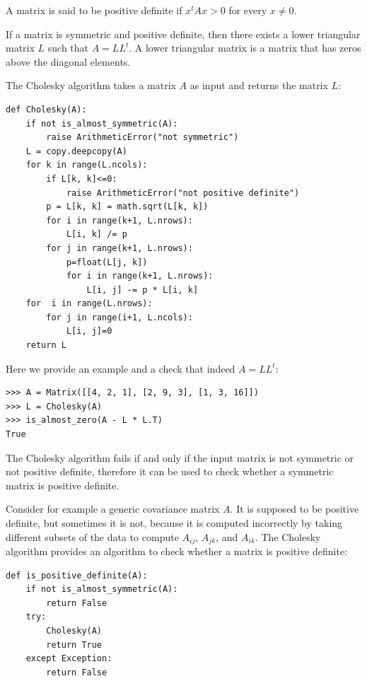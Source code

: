 \documentclass[justified, sixbynine]{tufte-book}
\def\ft{\small\tt}
\theoremstyle{plain}%
\newtheorem * {corollary}{Corollary}
\theoremstyle{definition}
\theoremstyle{remark}
\newtheorem * {remark}{Remark}
\newtheorem * {note}{Note}
\begin{document}
\begin{fullwidth}
A matrix is said to be positive definite if $x^t Ax>0$ for every $x\neq0$.

If a matrix is symmetric and positive definite, then there exists a lower triangular matrix $L$ such that $A=L L^t$. A lower triangular matrix is a matrix that has zeros above the diagonal elements.

The Cholesky algorithm takes a matrix $A$ as input and returns the matrix $L$:

\begin{lstlisting}[caption={in file: {\ft nlib.py}}]
def Cholesky(A):
    if not is_almost_symmetric(A):
        raise ArithmeticError("not symmetric")
    L = copy.deepcopy(A)
    for k in range(L.ncols):
        if L[k, k]<=0:
            raise ArithmeticError("not positive definite")
        p = L[k, k] = math.sqrt(L[k, k])
        for i in range(k+1, L.nrows):
            L[i, k] /= p
        for j in range(k+1, L.nrows):
            p=float(L[j, k])
            for i in range(k+1, L.nrows):
                L[i, j] -= p * L[i, k]
    for  i in range(L.nrows):
        for j in range(i+1, L.ncols):
            L[i, j]=0
    return L
\end{lstlisting}

Here we provide an example and a check that indeed $A=L L^t$:

\begin{lstlisting}[caption={in file: {\ft nlib.py}}]
>>> A = Matrix([[4, 2, 1], [2, 9, 3], [1, 3, 16]])
>>> L = Cholesky(A)
>>> is_almost_zero(A - L * L.T)
True
\end{lstlisting}

The Cholesky algorithm fails if and only if the input matrix is not symmetric or not positive definite, therefore it can be used to check whether a symmetric matrix is positive definite.

Consider for example a generic covariance matrix $A$. It is supposed to be positive definite, but sometimes it is not, because it is computed incorrectly by taking different subsets of the data to compute $A_{ij}$, $A_{jk}$, and $A_{ik}$. The Cholesky algorithm provides an algorithm to check whether a matrix is positive definite:

\begin{lstlisting}[caption={in file: {\ft nlib.py}}]
def is_positive_definite(A):
    if not is_almost_symmetric(A):
        return False
    try:
        Cholesky(A)
        return True
    except Exception:
        return False
\end{lstlisting}


\end{fullwidth}
\end{document}
